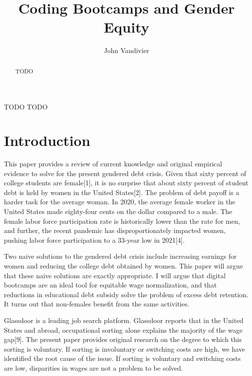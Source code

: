 \documentclass[review]{elsarticle}
\begin{document}
\begin{frontmatter}

    \title{
        Coding Bootcamps and Gender Equity
    }

    \author[mymainaddress]{John Vandivier}

    \begin{abstract}
        TODO
    \end{abstract}

    \begin{keyword}
        TODO %
        \MSC[2010] TODO %
    \end{keyword}

\end{frontmatter}

\pagebreak
\linenumbers


\section{Introduction}

This paper provides a review of current knowledge and original empirical evidence to solve for the present gendered debt crisis.
Given that sixty percent of college students are female[1],
it is no surprise that about sixty percent of student debt is held by women in the United States[2].
The problem of debt payoff is a harder task for the average woman.
In 2020, the average female worker in the United States made eighty-four cents on the dollar compared to a male.
The female labor force participation rate is historically lower than the rate for men,
and further,
the recent pandemic has disproportionately impacted women, pushing labor force participation to a 33-year low in 2021[4].

Two naive solutions to the gendered debt crisis include
increasing earnings for women
and reducing the college debt obtained by women.
This paper will argue that these naive solutions are exactly appropriate.
I will argue that digital bootcamps are an ideal tool for equitable wage normalization,
and that reductions in educational debt subsidy solve the problem of excess debt retention.
It turns out that non-females benefit from the same activities.


Glassdoor is a leading job search platform.
Glassdoor reports that in the United States and abroad, occupational sorting alone explains the majority of the wage gap[9].
The present paper provides original research on the degree to which this sorting is voluntary.
If sorting is involuntary or switching costs are high, we have identified the root cause of the issue.
If sorting is voluntary and switching costs are low, disparities in wages are not a problem to be solved.
\end{document}
